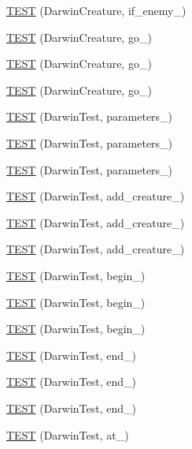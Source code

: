 \begin{DoxyCompactItemize}
\item 
\hyperlink{TestDarwin_8c_09_09_acf12080a13e608bdcf4964796bc170a8}{T\-E\-S\-T} (Darwin\-Creature, if\-\_\-enemy\-\_)
\item 
\hyperlink{TestDarwin_8c_09_09_af3b9ccdd5f6886e0c63280dd74cc858f}{T\-E\-S\-T} (Darwin\-Creature, go\-\_)
\item 
\hyperlink{TestDarwin_8c_09_09_a01958c4dee85db2c04fc084158009776}{T\-E\-S\-T} (Darwin\-Creature, go\-\_)
\item 
\hyperlink{TestDarwin_8c_09_09_aaad39393cc3dbe1694241ec4afa05ce6}{T\-E\-S\-T} (Darwin\-Creature, go\-\_)
\item 
\hyperlink{TestDarwin_8c_09_09_ad43bef13d8135e1310f2551487267ecd}{T\-E\-S\-T} (Darwin\-Test, parameters\-\_)
\item 
\hyperlink{TestDarwin_8c_09_09_aa6fce6ea55650e93bbd2ca51163f4172}{T\-E\-S\-T} (Darwin\-Test, parameters\-\_)
\item 
\hyperlink{TestDarwin_8c_09_09_adb0670ed20ec7fe3e3022a16b18cf18e}{T\-E\-S\-T} (Darwin\-Test, parameters\-\_)
\item 
\hyperlink{TestDarwin_8c_09_09_ac67bafe3569f40f6f27010341aab1728}{T\-E\-S\-T} (Darwin\-Test, add\-\_\-creature\-\_)
\item 
\hyperlink{TestDarwin_8c_09_09_ada0d2ac22873c7bcbe999eb6e6754e86}{T\-E\-S\-T} (Darwin\-Test, add\-\_\-creature\-\_)
\item 
\hyperlink{TestDarwin_8c_09_09_aaa4de3a95dbc4270e966be1a18c10cc3}{T\-E\-S\-T} (Darwin\-Test, add\-\_\-creature\-\_)
\item 
\hyperlink{TestDarwin_8c_09_09_ad7b5a137b7698d6dd709ffe50574d029}{T\-E\-S\-T} (Darwin\-Test, begin\-\_)
\item 
\hyperlink{TestDarwin_8c_09_09_af05aaeb0b7799b361ab340710b8c6ac2}{T\-E\-S\-T} (Darwin\-Test, begin\-\_)
\item 
\hyperlink{TestDarwin_8c_09_09_a8836b5511d7872952e346623c1979934}{T\-E\-S\-T} (Darwin\-Test, begin\-\_)
\item 
\hyperlink{TestDarwin_8c_09_09_af816116c40671e55f1e3a97aab09053f}{T\-E\-S\-T} (Darwin\-Test, end\-\_)
\item 
\hyperlink{TestDarwin_8c_09_09_aea4b4bd1265f059a6887ed097ce37a70}{T\-E\-S\-T} (Darwin\-Test, end\-\_)
\item 
\hyperlink{TestDarwin_8c_09_09_aedf5bae87a9bf297c8b0f3de06c1b17f}{T\-E\-S\-T} (Darwin\-Test, end\-\_)
\item 
\hyperlink{TestDarwin_8c_09_09_a5bcdb93be2022bfb3e8e2d492cfd9d15}{T\-E\-S\-T} (Darwin\-Test, at\-\_)

\end{DoxyCompactItemize}
